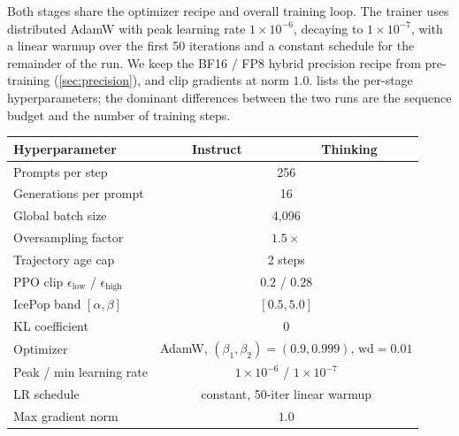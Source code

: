 \documentclass{llmxive}
\providecommand{\tableheadercolor}{}
\begin{document}
Both stages share the optimizer recipe and overall training loop. The
trainer uses distributed AdamW with peak learning rate $1\!\times\!10^{-6}$,
decaying to $1\!\times\!10^{-7}$, with a linear warmup over the first
50 iterations and a constant schedule for the remainder of the run. We
keep the BF16 / FP8 hybrid precision recipe from pre-training
(\cref{sec:precision}), and clip gradients at norm $1.0$.
 lists the per-stage hyperparameters; the
dominant differences between the two runs are the sequence budget and
the number of training steps.

\begin{table}[!htbp]
  \centering
  \small
  \begin{tabular}{@{}lcc@{}}
    \toprule
    \tableheadercolor
    \textbf{Hyperparameter} & \textbf{Instruct} & \textbf{Thinking} \\
    \midrule
    Prompts per step                                          & \multicolumn{2}{c}{256} \\
    Generations per prompt                                    & \multicolumn{2}{c}{16} \\
    Global batch size                                         & \multicolumn{2}{c}{4{,}096} \\
    Oversampling factor                                       & \multicolumn{2}{c}{$1.5\times$} \\
    Trajectory age cap                                        & \multicolumn{2}{c}{2 steps} \\
    PPO clip $\epsilon_\text{low}$ / $\epsilon_\text{high}$    & \multicolumn{2}{c}{$0.2$ / $0.28$} \\
    IcePop band $[\alpha, \beta]$                             & \multicolumn{2}{c}{$[0.5, 5.0]$} \\
    KL coefficient                                            & \multicolumn{2}{c}{$0$} \\
    Optimizer                                                 & \multicolumn{2}{c}{AdamW, $(\beta_1, \beta_2) = (0.9, 0.999)$, $\text{wd} = 0.01$} \\
    Peak / min learning rate                                  & \multicolumn{2}{c}{$1\!\times\!10^{-6}$ / $1\!\times\!10^{-7}$} \\
    LR schedule                                               & \multicolumn{2}{c}{constant, 50-iter linear warmup} \\
    Max gradient norm                                         & \multicolumn{2}{c}{$1.0$} \\

\end{tabular}
\end{table}
\end{document}
